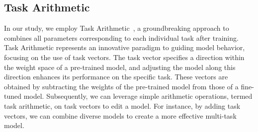 \subsection{Task Arithmetic}
In our study, we employ Task Arithmetic~\cite{ref10}, a groundbreaking approach to combines all parameters corresponding to each individual task after training. Task Arithmetic represents an innovative paradigm to guiding model behavior, focusing on the use of task vectors. The task vector specifies a direction within the weight space of a pre-trained model, and adjusting the model along this direction enhances its performance on the specific task. These vectors are obtained by subtracting the weights of the pre-trained model from those of a fine-tuned model. Subsequently, we can leverage simple arithmetic operations, termed task arithmetic, on task vectors to edit a model. For instance, by adding task vectors, we can combine diverse models to create a more effective multi-task model.